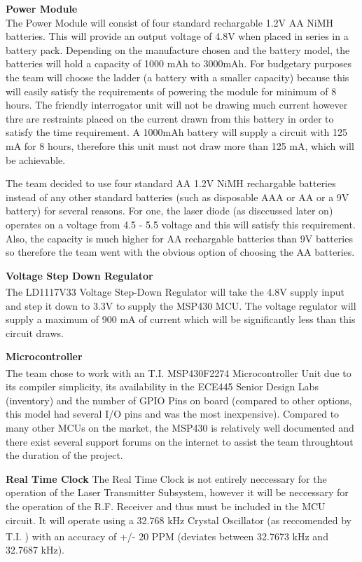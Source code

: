 \documentclass[letterpaper,10pt]{article}
\begin{document}
\begin{spacing}{1.15}
\normalsize\textbf{Power Module} \\
The Power Module will consist of four standard rechargable 1.2V AA NiMH batteries. This will provide an output voltage of 4.8V when placed in series in a battery pack. Depending on the manufacture chosen and the battery model, the batteries will hold a capacity of 1000 mAh to 3000mAh. For budgetary purposes the team will choose the ladder (a battery with a smaller capacity) because this will easily satisfy the requirements of powering the module for minimum of 8 hours. The friendly interrogator unit will not be drawing much current however thre are restraints placed on the current drawn from this battery in order to satisfy the time requirement. A 1000mAh battery will supply a circuit with 125 mA for 8 hours, therefore this unit must not draw more than 125 mA, which will be achievable.

The team decided to use four standard AA 1.2V NiMH rechargable batteries instead of any other standard batteries (such as disposable AAA or AA or a 9V battery) for several reasons. For one, the laser diode (as disccussed later on) operates on a voltage from 4.5 - 5.5 voltage and this will satisfy this requirement. Also, the capacity is much higher for AA rechargable batteries than 9V batteries so therefore the team went with the obvious option of choosing the AA batteries.

\normalsize\textbf{Voltage Step Down Regulator} \\
The LD1117V33 Voltage Step-Down Regulator\textsuperscript{\cite{LD1117-Voltage-Regulator}} will take the 4.8V supply input and step it down to 3.3V to supply the MSP430 MCU. The voltage regulator will supply a maximum of 900 mA of current which will be significantly less than this circuit draws.

\normalsize\textbf{Microcontroller} \\
The team chose to work with an T.I. MSP430F2274 Microcontroller Unit \textsuperscript{\cite{MSP430F2274}} due to its compiler simplicity, its availability in the ECE445 Senior Design Labs (inventory) and the number of GPIO Pins on board (compared to other options, this model had several I/O pins and was the most inexpensive). Compared to many other MCUs on the market, the MSP430 is relatively well documented and there exist several support forums on the internet to assist the team throughtout the duration of the project.

\normalsize\textbf{Real Time Clock}
The Real Time Clock is not entirely neccessary for the operation of the Laser Transmitter Subsystem, however it will be neccessary for the operation of the R.F. Receiver and thus must be included in the MCU circuit. It will operate using a 32.768 kHz Crystal Oscillator (as reccomended by T.I. \textsuperscript{\cite{RTC-Implementation}}) with an accuracy of +/- 20 PPM (deviates between 32.7673 kHz and 32.7687 kHz).


\end{spacing}
\end{document}
